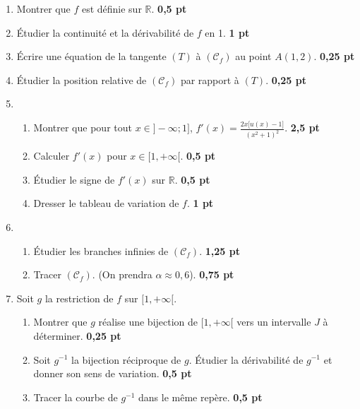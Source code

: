 \documentclass[12pt,a4paper]{article}
\begin{document}
\begin{enumerate}
    \item Montrer que $f$ est définie sur $\mathbb{R}$. \hfill \textbf{0,5 pt}
    \item Étudier la continuité et la dérivabilité de $f$ en 1. \hfill \textbf{1 pt}
    \item Écrire une équation de la tangente $(T)$ à $(\mathcal{C}_f)$ au point $A(1,2)$. \hfill \textbf{0,25 pt}
    \item Étudier la position relative de $(\mathcal{C}_f)$ par rapport à $(T)$. \hfill \textbf{0,25 pt}
		\item
		\begin{enumerate}
		    \item Montrer que pour tout $x \in ]-\infty;1]$, $f'(x) = \frac{2x\big[u(x) - 1\big]}{(x^2 + 1)^2}$. \hfill \textbf{2,5 pt}
    \item Calculer $f'(x)$ pour $x \in [1,+\infty[$. \hfill \textbf{0,5 pt}
    \item Étudier le signe de $f'(x)$ sur $\mathbb{R}$. \hfill \textbf{0,5 pt}
    \item Dresser le tableau de variation de $f$. \hfill \textbf{1 pt}
		\end{enumerate}
		\item 
		\begin{enumerate}
    \item Étudier les branches infinies de $(\mathcal{C}_f)$. \hfill \textbf{1,25 pt}
    \item Tracer $(\mathcal{C}_f)$. (On prendra $\alpha \approx 0,6$). \hfill \textbf{0,75 pt}
		\end{enumerate}
		
		\item  Soit $g$ la restriction de $f$ sur $[1, +\infty[$.
\begin{enumerate}
    \item Montrer que $g$ réalise une bijection de $[1, +\infty[$ vers un intervalle $J$ à déterminer. \hfill \textbf{0,25 pt}
    \item Soit $g^{-1}$ la bijection réciproque de $g$. Étudier la dérivabilité de $g^{-1}$ et donner son sens de variation. \hfill \textbf{0,5 pt}
    \item Tracer la courbe de $g^{-1}$ dans le même repère. \hfill \textbf{0,5 pt}
\end{enumerate}
\end{enumerate}
\end{document}
